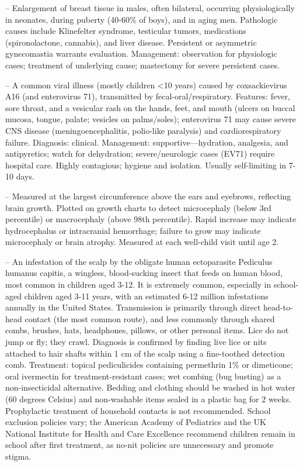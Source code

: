 -- Enlargement of breast tissue in males, often bilateral, occurring physiologically in neonates, during puberty (40-60\% of boys), and in aging men. Pathologic causes include Klinefelter syndrome, testicular tumors, medications (spironolactone, cannabis), and liver disease. Persistent or asymmetric gynecomastia warrants evaluation. Management: observation for physiologic cases; treatment of underlying cause; mastectomy for severe persistent cases.

-- A common viral illness (mostly children <10 years) caused by coxsackievirus A16 (and enterovirus 71), transmitted by fecal-oral/respiratory. Features: fever, sore throat, and a vesicular rash on the hands, feet, and mouth (ulcers on buccal mucosa, tongue, palate; vesicles on palms/soles); enterovirus 71 may cause severe CNS disease (meningoencephalitis, polio-like paralysis) and cardiorespiratory failure. Diagnosis: clinical. Management: supportive—hydration, analgesia, and antipyretics; watch for dehydration; severe/neurologic cases (EV71) require hospital care. Highly contagious; hygiene and isolation. Usually self-limiting in 7-10 days.

-- Measured at the largest circumference above the ears and eyebrows, reflecting brain growth. Plotted on growth charts to detect microcephaly (below 3rd percentile) or macrocephaly (above 98th percentile). Rapid increase may indicate hydrocephalus or intracranial hemorrhage; failure to grow may indicate microcephaly or brain atrophy. Measured at each well-child visit until age 2.

-- An infestation of the scalp by the obligate human ectoparasite Pediculus humanus capitis, a wingless, blood-sucking insect that feeds on human blood, most common in children aged 3-12. It is extremely common, especially in school-aged children aged 3-11 years, with an estimated 6-12 million infestations annually in the United States. Transmission is primarily through direct head-to-head contact (the most common route), and less commonly through shared combs, brushes, hats, headphones, pillows, or other personal items. Lice do not jump or fly; they crawl. Diagnosis is confirmed by finding live lice or nits attached to hair shafts within 1 cm of the scalp using a fine-toothed detection comb. Treatment: topical pediculicides containing permethrin 1\% or dimeticone; oral ivermectin for treatment-resistant cases; wet combing (bug busting) as a non-insecticidal alternative. Bedding and clothing should be washed in hot water (60 degrees Celsius) and non-washable items sealed in a plastic bag for 2 weeks. Prophylactic treatment of household contacts is not recommended. School exclusion policies vary; the American Academy of Pediatrics and the UK National Institute for Health and Care Excellence recommend children remain in school after first treatment, as no-nit policies are unnecessary and promote stigma.

